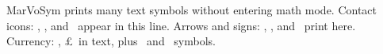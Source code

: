 \documentclass{article}
\begin{document}
MarVoSym prints many text symbols without entering math mode.
Contact icons: \Telefon, \Letter, and \Email\ appear in this line.
Arrows and signs: \MVRightarrow, \Checkedbox, and \CrossedBox\ print here.
Currency: \EUR, \pounds\ in text, plus \Biohazard\ and \PeaceDove\ symbols.
\end{document}

